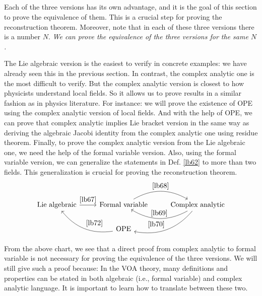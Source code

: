 \documentclass[12pt,a4paper,notitlepage]{article}
\theoremstyle{definition}
\theoremstyle{plain}
\numberwithin{equation}{section}
\begin{document}
\subsection{}


Each of the three versions has its own advantage, and it is the goal of this section to prove the equivalence of them. This is a crucial step for proving the reconstruction theorem. Moreover, note that in each of these three versions there is a number $N$. \emph{We can prove the  equivalence of the three versions for the same $N$.}

The Lie algebraic version is the easiest to verify in concrete examples: we have already seen this in the previous section. In contrast, the complex analytic one is the most difficult to verify. But the complex analytic version is closest to how physicists understand local fields. So it allows us to prove results in a similar fashion as in physics literature. For instance: we will prove the existence of OPE using the complex analytic version of local fields. And with the help of OPE, we can prove that complex analytic implies Lie bracket version in the same way as deriving the algebraic Jacobi identity from the complex analytic one using residue theorem. Finally, to prove the complex analytic version from the Lie algebraic one, we need the help of the formal variable version. Also, using the formal variable version, we can generalize the statements in Def. \ref{lb62} to more than two fields. This generalization is crucial for proving the reconstruction theorem.
\begin{equation*}
\begin{tikzcd}
	\text{Lie algebraic} \arrow[r,"\ref{lb67}"] & \text{Formal variable} \arrow[r, bend left,"\ref{lb68}"] & \text{Complex analytic} \arrow[l, bend left,"\ref{lb69}"'] \arrow[ld, bend left,"\ref{lb70}"'] \\
	& \text{OPE} \arrow[lu, bend left,"\ref{lb72}"']             &                                                                    
\end{tikzcd}
\end{equation*}

From the above chart, we see that a direct proof from complex analytic to formal variable is not necessary for proving the equivalence of the three versions. We will still give such a proof because: In the VOA theory,  many definitions and properties can be stated in both algebraic (i.e., formal variable)  and complex analytic language. It is important to learn how to translate between these two. 
\end{document}
